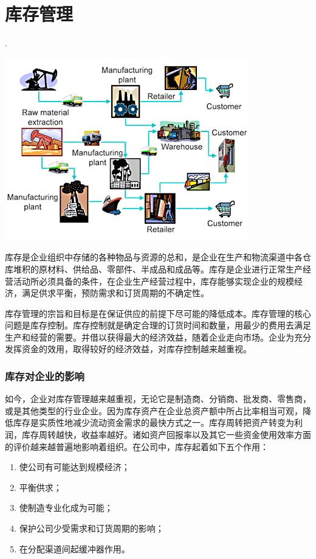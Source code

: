 \section {库存管理}

.
    \begin{center}
        \includegraphics[scale=1.5] {factory.jpg}
    \end{center}

    库存是企业组织中存储的各种物品与资源的总和，是企业在生产和物流渠道中各仓库堆积的原材料、供给品、零部件、半成品和成品等。库存是企业进行正常生产经营活动所必须具备的条件，在企业生产经营过程中，库存能够实现企业的规模经济，满足供求平衡，预防需求和订货周期的不确定性。

    库存管理的宗旨和目标是在保证供应的前提下尽可能的降低成本。库存管理的核心问题是库存控制。库存控制就是确定合理的订货时间和数量，用最少的费用去满足生产和经营的需要。并借以获得最大的经济效益，随着企业走向市场。企业为充分发挥资金的效用，取得较好的经济效益，对库存控制越来越重视。

\subsubsection { 库存对企业的影响}

    如今，企业对库存管理越来越重视，无论它是制造商、分销商、批发商、零售商，或是其他类型的行业企业。因为库存资产在企业总资产额中所占比率相当可观，降低库存是实质性地减少流动资金需求的最快方式之一。库存周转把资产转变为利润，库存周转越快，收益率越好。诸如资产回报率以及其它一些资金使用效率方面的评价越来越普遍地影响着组织。在公司中，库存起着如下五个作用：

    \begin{enumerate}
        \item  使公司有可能达到规模经济；
        \item  平衡供求；
        \item  使制造专业化成为可能；
        \item  保护公司少受需求和订货周期的影响；
        \item  在分配渠道间起缓冲器作用。
    \end{enumerate}

